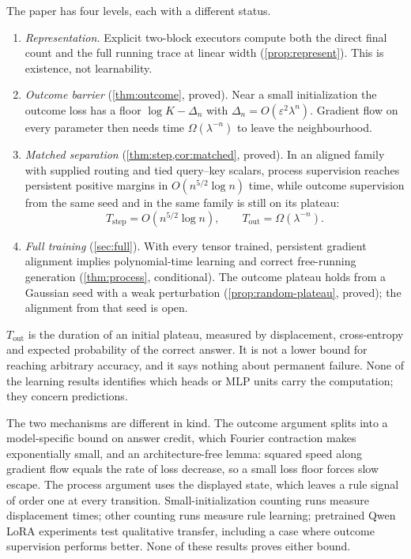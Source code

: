 The paper has four levels, each with a different status.
\begin{enumerate}[label=(\arabic*),leftmargin=*,itemsep=1pt,topsep=2pt]
\item \emph{Representation.} Explicit two-block executors compute both the direct final count and the full running trace at linear width (\cref{prop:represent}). This is existence, not learnability.
\item \emph{Outcome barrier} (\cref{thm:outcome}, proved). Near a small initialization the outcome loss has a floor $\log K-\Delta_n$ with $\Delta_n=O(\varepsilon^2\lambda^n)$. Gradient flow on every parameter then needs time $\Omega(\lambda^{-n})$ to leave the neighbourhood.
\item \emph{Matched separation} (\cref{thm:step,cor:matched}, proved). In an aligned family with supplied routing and tied query--key scalars, process supervision reaches persistent positive margins in $O(n^{5/2}\log n)$ time, while outcome supervision from the same seed and in the same family is still on its plateau:
\begin{equation}\label{eq:headline}
\boxed{T_{\mathrm{step}}=O(n^{5/2}\log n),\qquad T_{\mathrm{out}}=\Omega(\lambda^{-n}).}
\end{equation}
\item \emph{Full training} (\cref{sec:full}). With every tensor trained, persistent gradient alignment implies polynomial-time learning and correct free-running generation (\cref{thm:process}, conditional). The outcome plateau holds from a Gaussian seed with a weak perturbation (\cref{prop:random-plateau}, proved); the alignment from that seed is open.
\end{enumerate}
$T_{\mathrm{out}}$ is the duration of an initial plateau, measured by displacement, cross-entropy and expected probability of the correct answer. It is not a lower bound for reaching arbitrary accuracy, and it says nothing about permanent failure. None of the learning results identifies which heads or MLP units carry the computation; they concern predictions.

The two mechanisms are different in kind. The outcome argument splits into a model-specific bound on answer credit, which Fourier contraction makes exponentially small, and an architecture-free lemma: squared speed along gradient flow equals the rate of loss decrease, so a small loss floor forces slow escape. The process argument uses the displayed state, which leaves a rule signal of order one at every transition. Small-initialization counting runs measure displacement times; other counting runs measure rule learning; pretrained Qwen LoRA experiments test qualitative transfer, including a case where outcome supervision performs better. None of these results proves either bound.

